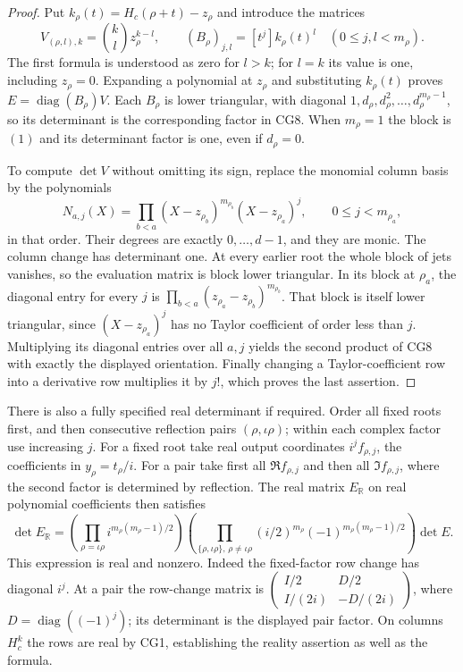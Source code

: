 \begin{proof}
Put $k_\rho(t)=H_c(\rho+t)-z_\rho$ and introduce the matrices
\[
 V_{(\rho,l),k}=\binom kl z_\rho^{k-l},\qquad
 (B_\rho)_{j,l}=[t^j]k_\rho(t)^l
 \quad(0\le j,l<m_\rho).
\]
The first formula is understood as zero for $l>k$; for $l=k$
its value is one, including $z_\rho=0$. Expanding a polynomial
at $z_\rho$ and substituting $k_\rho(t)$ proves
$E=\operatorname{diag}(B_\rho)V$.
Each $B_\rho$ is lower triangular, with diagonal
$1,d_\rho,d_\rho^2,\ldots,d_\rho^{m_\rho-1}$, so its determinant
is the corresponding factor in CG8. When $m_\rho=1$ the block
is $(1)$ and its determinant factor is one, even if $d_\rho=0$.

To compute $\det V$ without omitting its sign, replace the monomial
column basis by the polynomials
\[
 N_{a,j}(X)=\prod_{b<a}(X-z_{\rho_b})^{m_{\rho_b}}
                       (X-z_{\rho_a})^j,
 \qquad 0\le j<m_{\rho_a},
\]
in that order. Their degrees are exactly $0,\ldots,d-1$, and they
are monic. The column change has determinant one. At every earlier
root the whole block of jets vanishes, so the evaluation matrix
is block lower triangular. In its block at $\rho_a$, the diagonal
entry for every $j$ is
$\prod_{b<a}(z_{\rho_a}-z_{\rho_b})^{m_{\rho_b}}$.
That block is itself lower triangular, since $(X-z_{\rho_a})^j$
has no Taylor coefficient of order less than $j$.
Multiplying its diagonal entries over all $a,j$ yields the second
product of CG8 with exactly the displayed orientation.
Finally changing a Taylor-coefficient row into a derivative row
multiplies it by $j!$, which proves the last assertion.
\end{proof}

There is also a fully specified real determinant if required.
Order all fixed roots first, and then consecutive reflection pairs
$(\rho,\iota\rho)$; within each complex factor use increasing $j$.
For a fixed root take real output coordinates $i^j f_{\rho,j}$,
the coefficients in $y_\rho=t_\rho/i$. For a pair take first all
$\Re f_{\rho,j}$ and then all $\Im f_{\rho,j}$, where the second
factor is determined by reflection. The real matrix $E_\mathbb{R}$ on
real polynomial coefficients then satisfies
\begin{equation}
 \det E_\mathbb{R}=
 \left(\prod_{\rho=\iota\rho}i^{m_\rho(m_\rho-1)/2}\right)
 \left(\prod_{\{\rho,\iota\rho\},\,\rho\ne\iota\rho}
       (i/2)^{m_\rho}(-1)^{m_\rho(m_\rho-1)/2}\right)\det E.
 \tag{CG9}\label{cg:real-det}
\end{equation}
This expression is real and nonzero. Indeed the fixed-factor row
change has diagonal $i^j$. At a pair the row-change matrix is
$\left(\begin{smallmatrix}I/2&D/2\\ I/(2i)&-D/(2i)\end{smallmatrix}\right)$,
where $D=\operatorname{diag}((-1)^j)$; its determinant is the
displayed pair factor. On columns $H_c^k$ the rows are real by
CG1, establishing the reality assertion as well as the formula.

